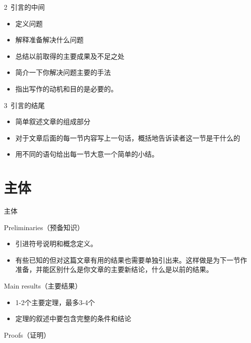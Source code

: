 \documentclass[13pt]{ctexbeamer}
\begin{document}
\begin{frame}{2~引言的中间}
	\begin{itemize}
		
		\item 定义问题
		
		\item 解释准备解决什么问题
		\item 总结以前取得的主要成果及不足之处
		\item 简介一下你解决问题主要的手法
		\item 指出写作的动机和目的是必要的。
	\end{itemize}
\end{frame}

\begin{frame}{3~引言的结尾}
	\begin{itemize}
		
		\item 简单叙述文章的组成部分
		
		\item 对于文章后面的每一节内容写上一句话，概括地告诉读者这一节是干什么的
		\item 用不同的语句给出每一节大意一个简单的小结。
	\end{itemize}
\end{frame}

\section{主体}

\begin{frame}{主体}
	


	
	Preliminaries（预备知识）
	\begin{itemize}
		\item  引进符号说明和概念定义。
		\item  有些已知的但对这篇文章有用的结果也需要单独引出来。这样做是为下一节作准备，并能区别什么是你文章的主要新结论，什么是以前的结果。
	\end{itemize}
	Main results（主要结果）
		\begin{itemize}
		\item  1-2个主要定理，最多3-4个
		\item 定理的叙述中要包含完整的条件和结论
	\end{itemize}

Proofs（证明）
\end{frame}


	\setcounter{tocdepth}{2}
\frame{\tableofcontents[currentsection]}
\end{document}

